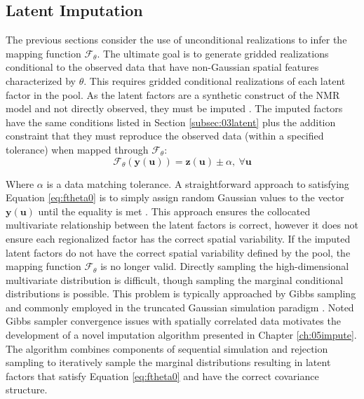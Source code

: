 \FloatBarrier
\subsection{Latent Imputation}
\label{subsec:03impute}

The previous sections consider the use of unconditional realizations to infer the mapping function $\mathcal{F}_{\theta}$. The ultimate goal is to generate gridded realizations conditional to the observed data that have non-Gaussian spatial features characterized by $\theta$. This requires gridded conditional realizations of each latent factor in the pool. As the latent factors are a synthetic construct of the \gls{NMR} model and not directly observed, they must be imputed \citep{little2019statistical}. The imputed factors have the same conditions listed in Section \ref{subsec:03latent} plus the addition constraint that they must reproduce the observed data (within a specified tolerance) when mapped through $\mathcal{F}_{\theta}$:
\begin{equation}
    \mathcal{F}_{\theta}(\mathbf{y}(\mathbf{u})) = \mathbf{z}(\mathbf{u}) \pm \alpha, \ \forall \mathbf{u}
    \label{eq:ftheta0}
\end{equation}

Where $\alpha$ is a data matching tolerance. A straightforward approach to satisfying Equation \ref{eq:ftheta0} is to simply assign random Gaussian values to the vector $\mathbf{y}(\mathbf{u})$ until the equality is met \citep{silva2018enhanced}. This approach ensures the collocated multivariate relationship between the latent factors is correct, however it does not ensure each regionalized factor has the correct spatial variability. If the imputed latent factors do not have the correct spatial variability defined by the pool, the mapping function $\mathcal{F}_{\theta}$ is no longer valid. Directly sampling the high-dimensional multivariate distribution is difficult, though sampling the marginal conditional distributions is possible. This problem is typically approached by Gibbs sampling \citep{geman1984stochastic} and commonly employed in the truncated Gaussian simulation paradigm \citep{arroyo2020iterative,madani2021enhanced}. Noted Gibbs sampler convergence issues with spatially correlated data motivates the development of a novel imputation algorithm presented in Chapter \ref{ch:05impute}. The algorithm combines components of sequential simulation and rejection sampling to iteratively sample the marginal distributions resulting in latent factors that satisfy Equation \ref{eq:ftheta0} and have the correct covariance structure.

